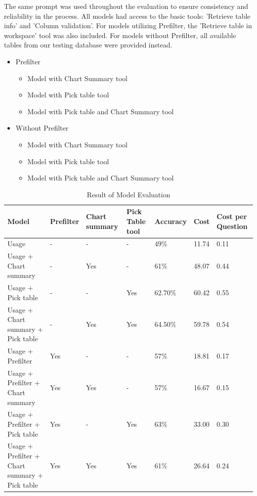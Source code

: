     The same prompt was used throughout the evaluation to ensure consistency and reliability in the process. All models had access to the basic tools: 'Retrieve table info' and 'Column validation'. For models utilizing Prefilter, the 'Retrieve table in workspace' tool was also included. For models without Prefilter, all available tables from our testing database were provided instead.
    \begin{itemize}
        \item Prefilter
        \begin{itemize}
            \item Model with Chart Summary tool
            \item Model with Pick table tool
            \item Model with Pick table and Chart Summary tool
        \end{itemize}
        \item Without Prefilter
        \begin{itemize}
            \item Model with Chart Summary tool
            \item Model with Pick table tool
            \item Model with Pick table and Chart Summary tool
        \end{itemize}
    \end{itemize}
    \begin{table}[H]
        \centering
        \caption[Result of Model Evaluation]{Result of Model Evaluation}
        \begin{tabular}{|p{4cm}|p{2cm}|p{1cm}|p{1cm}|p{2cm}|p{1cm}|p{1cm}|}
            \hline
            \textbf{Model} & \textbf{Prefilter} & \textbf{Chart summary} & \textbf{Pick Table tool} & \textbf{Accuracy} & \textbf{Cost} & \textbf{Cost per Question} \\
            \hline
            Usage & - & - & - &49\% & 11.74 & 0.11 \\
            \hline
            Usage + Chart summary & - & Yes & - & 61\% & 48.07 & 0.44 \\
            \hline
            Usage + Pick table & - & - & Yes & 62.70\% & 60.42 & 0.55 \\
            \hline
            Usage + Chart summary + Pick table & - & Yes & Yes & 64.50\% & 59.78 & 0.54 \\
            \hline
            Usage + Prefilter & Yes & - & - & 57\% & 18.81 & 0.17 \\
            \hline
            Usage + Prefilter + Chart summary & Yes & Yes & - & 57\% & 16.67 & 0.15 \\
            \hline
            Usage + Prefilter + Pick table & Yes & - & Yes & 63\% & 33.00 & 0.30 \\
            \hline
            Usage + Prefilter + Chart summary + Pick table & Yes & Yes & Yes & 61\% & 26.64 & 0.24 \\ 
            \hline 
        \end{tabular}
    \end{table}
